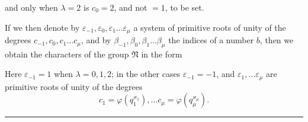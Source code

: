 and only when $\lambda = 2$ is $c_0 = 2$, and not $= 1$, to be set.

If we then denote by $\varepsilon_{-1}, \varepsilon_0, \varepsilon_1 \ldots \varepsilon_\mu$ a system of primitive
roots of unity of the degrees $c_{-1}, c_0, c_1 \ldots c_\mu$, and by
$\beta_{-1}, \beta_0, \beta_1 \ldots \beta_\mu$ the indices of a number $b$, then we obtain the
characters of the group $\mathfrak{N}$ in the form


Here $\varepsilon_{-1} = 1$ when $\lambda = 0, 1, 2$; in the other
cases $\varepsilon_{-1} = -1$, and $\varepsilon_1, \ldots \varepsilon_\mu$ are primitive roots of unity
 of the degrees
\[
c_1 = \varphi(q_1^{\varkappa_1}), \ldots c_\mu = \varphi(q_\mu^{\varkappa_\mu}).
\]

\begin{center}
\rule{3cm}{0.4pt}
\end{center}
